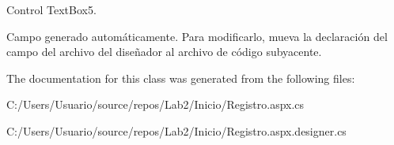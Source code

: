 Control Text\+Box5. 

Campo generado automáticamente. Para modificarlo, mueva la declaración del campo del archivo del diseñador al archivo de código subyacente. 

The documentation for this class was generated from the following files\+:\begin{DoxyCompactItemize}
\item 
C\+:/\+Users/\+Usuario/source/repos/\+Lab2/\+Inicio/Registro.\+aspx.\+cs\item 
C\+:/\+Users/\+Usuario/source/repos/\+Lab2/\+Inicio/Registro.\+aspx.\+designer.\+cs\end{DoxyCompactItemize}
